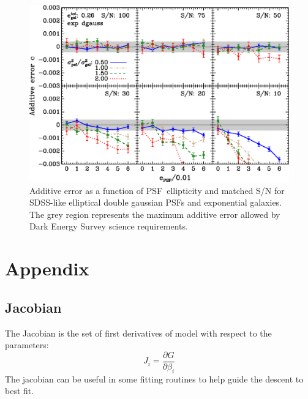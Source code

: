 \documentclass[10pt,preprint]{aastex}
\newcommand{\psf}{PSF}
\begin{document}
\begin{figure}[t] \centering
 \centering 
 \includegraphics[scale=1]{figures/set-epsf-edg02-yr-0.003-0.003-vs-epsf.eps}

 \caption{Additive error as a function of \psf\ ellipticity and matched S/N for
 SDSS-like elliptical double gaussian \psf s and exponential galaxies.  The grey
 region represents the maximum additive error allowed by Dark
 Energy Survey science requirements.  }

 \label{fig:edgadderr}

\end{figure}







\appendix 

\section{Appendix}
\subsection{Jacobian}

The Jacobian is the set of first derivatives of model with respect
to the parameters:
\begin{equation}
J_i = \frac{\partial G}{\partial \beta_i}
\end{equation}
The jacobian can be useful in some fitting routines to help guide the descent
to best fit.
\end{document}
